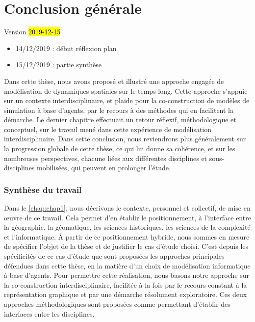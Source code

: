 \graphicspath{{chap7-Conclusion/}}

\chapter*{Conclusion générale}
\label{chap:conclu}
\vspace*{-5em}
\begin{center}
	{\large Version \hl{2019-12-15}}
\end{center}
\vspace*{-1em}
\begin{itemize}
	\item 14/12/2019 : début réflexion plan
	\item 15/12/2019 : partie synthèse
\end{itemize}

Dans cette thèse, nous avons proposé et illustré une approche engagée de modélisation de dynamiques spatiales sur le temps long.
Cette approche s'appuie sur un contexte interdisciplinaire, et plaide pour la co-construction de modèles de simulation à base d'agents, par le recours à des méthodes qui en facilitent la démarche.
Le dernier chapitre effectuait un retour réflexif, méthodologique et conceptuel, sur le travail mené dans cette expérience de modélisation interdisciplinaire.
Dans cette conclusion, nous reviendrons plus généralement sur la progression globale de cette thèse, ce qui lui donne sa cohérence, et sur les nombreuses perspectives, chacune liées aux différentes disciplines et sous-disciplines mobilisées, qui peuvent en prolonger l'étude.

\subsection*{Synthèse du travail}

Dans le \cref{chap:chap1}, nous décrivons le contexte, personnel et collectif, de mise en œuvre de ce travail.
Cela permet d'en établir le positionnement, à l'interface entre la géographie, la géomatique, les sciences historiques, les sciences de la complexité et l'informatique.
À partir de ce positionnement hybride, nous sommes en mesure de spécifier l'objet de la thèse et de justifier le cas d'étude choisi.
C'est depuis les spécificités de ce cas d'étude que sont proposées les approches principales défendues dans cette thèse, en la matière d'un choix de modélisation informatique à base d'agents.
Pour permettre cette réalisation, nous basons notre approche sur la co-construction interdisciplinaire, facilitée à la fois par le recours constant à la représentation graphique et par une démarche résolument exploratoire.
Ces deux approches méthodologiques sont proposées comme permettant d'établir des interfaces entre les disciplines.

